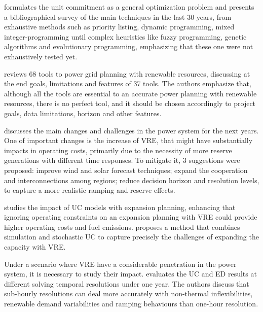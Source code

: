 \documentclass[12pt,LUDisStyle,twosided]{book}
\begin{document}
\citeauthor{padhy} \cite{padhy} formulates the unit commitment as a general optimization problem and presents a bibliographical survey of the main techniques in the last 30 years, from exhaustive methods such as priority listing, dynamic programming, mixed integer-programming until complex heuristics like fuzzy programming, genetic algorithms and evolutionary programming, emphasizing that these one were not exhaustively tested yet. 

\citeauthor{connolly} \cite{connolly} reviews 68 tools to power grid planning with renewable resources, discussing at the end goals, limitations and features of 37 tools. The authors emphasize that, although all the tools are essential to an accurate power planning with renewable resources, there is no perfect tool, and it should be chosen accordingly to project goals, data limitations, horizon and other features. 


\citeauthor{kassakian} \cite{kassakian} discusses the main changes and challenges in the power system for the next years. One of important changes is the increase of VRE, that might have substantially impacts in operating costs, primarily due to the necessity of more reserve generations with different time responses. To mitigate it, 3 suggestions were proposed: improve wind and solar forecast techniques; expand the cooperation and interconnections among regions; reduce decision horizon and resolution levels, to capture a more realistic ramping and reserve effects.

\citeauthor{palmintier} \cite{palmintier} studies the impact of UC models with expansion planning, enhancing that ignoring operating constraints on an expansion planning with VRE could provide higher operating costs and fuel emissions. \citeauthor{hargreaves}  \cite{hargreaves} proposes a method that combines simulation and stochastic UC to capture precisely the challenges of expanding the capacity with VRE.

Under a scenario where VRE have a considerable penetration in the power system, it is necessary to study their impact. \citeauthor{deane} \cite{deane} evaluates the UC and ED results at different solving temporal resolutions under one year. The authors discuss that sub-hourly resolutions can deal more accurately with non-thermal inflexibilities, renewable demand variabilities and ramping behaviours than one-hour resolution. 
\end{document}
